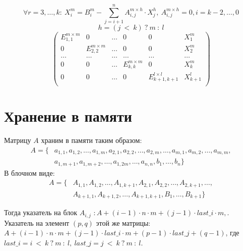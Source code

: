 \documentclass[12pt]{article}
\begin{document}
        \[ \forall r = 3, \ldots, k:\ X_{i}^{m} = B_{i}^{m} - \sum_{j = i + 1}^{n} A^{m \times h}_{i, j} \cdot X^{h}_{j},\ A^{m \times h}_{i, j} = 0, i = k - 2, \ldots, 0\]
        \[h = (j\ <\ k )\ ?\ m\ :\ l \]
        \[
        \left(
        \begin{array}{ccccc|c}
            E_{1,1}^{m \times m} & 0                    & \ldots & 0                      & 0                         & X^{m}_{1}   \\  
            0                    & E_{2,2}^{m \times m} & \ldots & 0                      & 0                         & X^{m}_{2}   \\  
            \ldots               & \ldots               & \ldots & \ldots                 & \ldots                    & \ldots      \\  
            0                    & 0                    & \ldots & E_{k,k}^{m \times m  } & 0                         & X^{m}_{k}   \\  
            0                    & 0                    & \ldots & 0                      & E_{k+1, k+1}^{l \times l} & X^{l}_{k+1} \\  
        \end{array}
        \right)
        \]
    
        \section{Хранение в памяти}
    \quad Матрицу $A$ храним в памяти таким образом: 
        \begin{align*}
            A = \{&a_{1,1}, a_{1,2},  \ldots , a_{1,m},
                    a_{2,1}, a_{2,2}, \ldots , a_{2,m}, \ldots,
                    a_{m,1}, a_{m,2}, \ldots , a_{m,m}, \\
                    &a_{1,m+1}, a_{1,m+2}, \ldots , a_{1,2m}, \ldots, a_{n,n}, 
                    b_{1},\ldots, b_{n} \}
        \end{align*}
        \quad    В блочном виде:
        \begin{align*}
            A = \{&A_{1,1}, A_{1,2},\ldots , A_{1,k+1},
            A_{2,1}, A_{2,2},      \ldots , A_{2,k+1}, \ldots, \\
            &A_{k+1,1}, A_{k+1,2},  \ldots , A_{k+1,k+1},B_{1},\ldots, B_{k+1} \}
        \end{align*}

        Тогда указатель на блок $A_{i, j}$ $: A + (i - 1) \cdot n \cdot m + (j - 1) \cdot last\_i \cdot m,$. \\
        Указатель на элемент $(p,q)$ этой же матрицы: $A + (i - 1) \cdot n \cdot m + (j - 1) \cdot last\_i \cdot m + (p - 1) \cdot last\_j + (q - 1)$,
        где $ last\_i = i\ <\ k\ ?\ m\ :\ l,\ last\_j = j\ <\ k\ ?\ m\ :\ l$.
        
\end{document}
